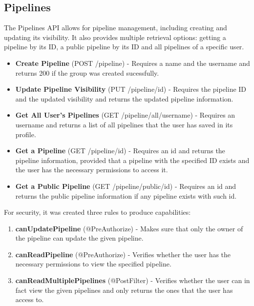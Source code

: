 \documentclass[acmart, nonacm]{acmart}
\begin{document}
\subsection{Pipelines}
The Pipelines API allows for pipeline management, including creating and updating its visibility. It also provides multiple retrieval options: getting a pipeline by its ID, a public pipeline 
by its ID and all pipelines of a specific user.
\begin{itemize}
    \item \textbf{Create Pipeline} (POST /pipeline) - Requires a name and the username and returns 200 if the group was created sucessfully.
    \item \textbf{Update Pipeline Visibility} (PUT /pipeline/{id}) - Requires the pipeline ID and the updated visibility and returns the updated pipeline information.
    \item \textbf{Get All User's Pipelines} (GET /pipeline/all/{username}) - Requires an username and returns a list of all pipelines that the user has saved in its profile.
    \item \textbf{Get a Pipeline} (GET /pipeline/{id}) - Requires an id and returns the pipeline information, provided that a pipeline with the specified ID exists and the user has the 
    necessary permissions to access it.
    \item \textbf{Get a Public Pipeline} (GET /pipeline/public/{id}) - Requires an id and returns the public pipeline information if any pipeline exists with such id.
\end{itemize}

For security, it was created three rules to produce capabilities:
\begin{enumerate}
    \item \textbf{canUpdatePipeline} (@PreAuthorize) - Makes sure that only the owner of the pipeline can update the given pipeline.
    \item \textbf{canReadPipeline} (@PreAuthorize) - Verifies whether the user has the necessary permissions to view the specified pipeline.
    \item \textbf{canReadMultiplePipelines} (@PostFilter) - Verifies whether the user can in fact view the given pipelines and only returns the ones that the user has access to.
\end{enumerate}

\end{document}
